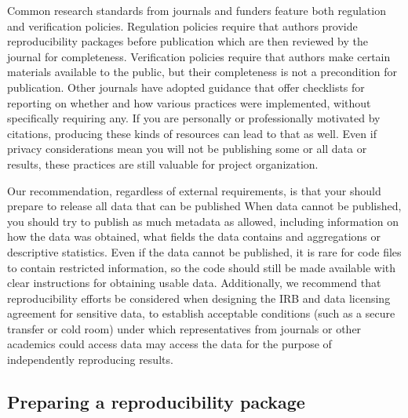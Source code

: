 Common research standards from journals and funders feature both
regulation and verification policies.
Regulation policies require that authors
provide reproducibility packages before publication
which are then reviewed by the journal for completeness.
Verification policies require that authors
make certain materials available to the public,
but their completeness is not a precondition for publication.
Other journals have adopted guidance that offer checklists
for reporting on whether and how various practices were implemented,
without specifically requiring any.
If you are personally or professionally motivated by citations,
producing these kinds of resources can lead to that as well.
Even if privacy considerations mean 
you will not be publishing some or all data or results,
these practices are still valuable for project organization.

Our recommendation, regardless of external requirements,
is that your should prepare to release all data that can be published
When data cannot be published, you should try to publish as much metadata as allowed, 
including information on how the data was obtained, 
what fields the data contains and aggregations or descriptive statistics. 
Even if the data cannot be published, 
it is rare for code files to contain restricted information, 
so the code should still be made available with clear instructions for obtaining usable data. 
Additionally, we recommend that reproducibility efforts be considered 
when designing the IRB and data licensing agreement for sensitive data, 
to establish acceptable conditions (such as a secure transfer or cold room) 
under which representatives from journals or other academics could access data
may access the data for the purpose of independently reproducing results.

\subsection{Preparing a reproducibility package}

